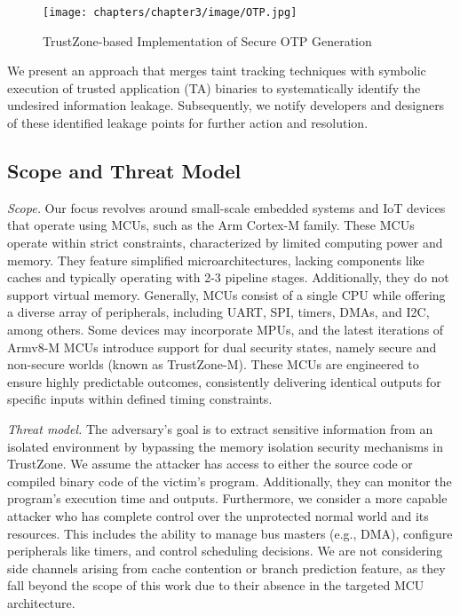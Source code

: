 \begin{figure}
  \centering
  \medskip
  \texttt{[image: chapters/chapter3/image/OTP.jpg]}
  \caption[Short caption for Table of Figures]{TrustZone-based Implementation of Secure OTP Generation}
  \label{fig:OTP}
\end{figure}

We present an approach that merges taint tracking techniques with symbolic execution of trusted application (\gls{TA}) binaries to systematically identify the undesired information leakage. Subsequently, we notify developers and designers of these identified leakage points for further action and resolution. 

\subsection{Scope and Threat Model}

\textit{Scope.} Our focus revolves around small-scale embedded systems and IoT devices that operate using MCUs, such as the Arm Cortex-M family. These MCUs operate within strict constraints, characterized by limited computing power and memory. They feature simplified microarchitectures, lacking components like caches and typically operating with 2-3 pipeline stages. Additionally, they do not support virtual memory. Generally, MCUs consist of a single CPU while offering a diverse array of peripherals, including UART, SPI, timers, DMAs, and I2C, among others. Some devices may incorporate MPUs, and the latest iterations of Armv8-M MCUs introduce support for dual security states, namely secure and non-secure worlds (known as TrustZone-M). These MCUs are engineered to ensure highly predictable outcomes, consistently delivering identical outputs for specific inputs within defined timing constraints.

\textit{Threat model.} The adversary’s goal is to extract sensitive information from an isolated environment by bypassing the memory isolation security mechanisms in TrustZone. We assume the attacker has access to either the source code or compiled binary code of the victim's program. Additionally, they can monitor the program's execution time and outputs. Furthermore, we consider a more capable attacker who has complete control over the unprotected normal world and its resources. This includes the ability to manage bus masters (e.g., DMA), configure peripherals like timers, and control scheduling decisions. We are not considering side channels arising from cache contention or branch prediction feature, as they fall beyond the scope of this work due to their absence in the targeted MCU architecture.

